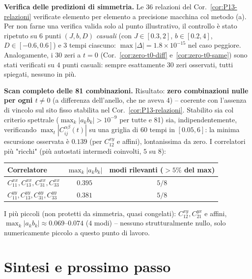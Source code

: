 \documentclass[11pt,a4paper]{article}
\begin{document}
\textbf{Verifica delle predizioni di simmetria.} Le $36$ relazioni del
Cor.~\ref{cor:P13-relazioni} verificate elemento per elemento a precisione macchina col metodo
(a). Per non farne una verifica valida solo al punto illustrativo, il controllo è stato ripetuto
su $6$ punti $(J,b,D)$ \emph{casuali} (con $J\in[0.3,2]$, $b\in[0.2,4]$, $D\in[-0.6,0.6]$) e
$3$ tempi ciascuno: $\max|\Delta|=1.8\times10^{-15}$ nel caso peggiore. Analogamente, i $30$
zeri a $t=0$ (Cor.~\ref{cor:zero-t0-diff} e~\ref{cor:zero-t0-same}) sono stati verificati su $4$
punti casuali: sempre esattamente $30$ zeri osservati, tutti spiegati, nessuno in più.

\textbf{Scan completo delle 81 combinazioni.} Risultato: \textbf{zero combinazioni nulle per ogni
$t\neq0$} (a differenza dell'anello, che ne aveva 4) -- coerente con l'assenza di vincolo sul sito
fisso stabilita nel Cor.~\ref{cor:P13-relazioni}. Stabilito sia col criterio spettrale
($\max_k|a_kb_k|>10^{-9}$ per tutte e 81) sia, indipendentemente, verificando
$\max_t|C_{ij}^{\alpha\beta}(t)|$ su una griglia di $60$ tempi in $[0.05,6]$: la minima escursione
osservata è $0.139$ (per $C_{12}^{xy}$ e affini), lontanissima da zero. I correlatori più
"ricchi" (più autostati intermedi coinvolti, $5$ su $8$):

\begin{center}
\renewcommand{\arraystretch}{1.15}
\begin{tabular}{@{}lcc@{}}
\toprule
Correlatore & $\max_k|a_kb_k|$ & modi rilevanti ($>5\%$ del max) \\
\midrule
$C_{11}^{xx},C_{13}^{xx},C_{31}^{xx},C_{33}^{xx}$ & $0.395$ & $5/8$ \\
$C_{11}^{yy},C_{13}^{yy},C_{31}^{yy},C_{33}^{yy}$ & $0.381$ & $5/8$ \\
\bottomrule
\end{tabular}
\end{center}
I più piccoli (non protetti da simmetria, quasi congelati): $C_{12}^{xy},C_{21}^{yx}$ e affini,
$\max_k|a_kb_k|\approx0.069$--$0.074$ ($4$ modi) -- nessuno strutturalmente nullo, solo
numericamente piccolo a questo punto di lavoro.

\section{Sintesi e prossimo passo}
\end{document}
